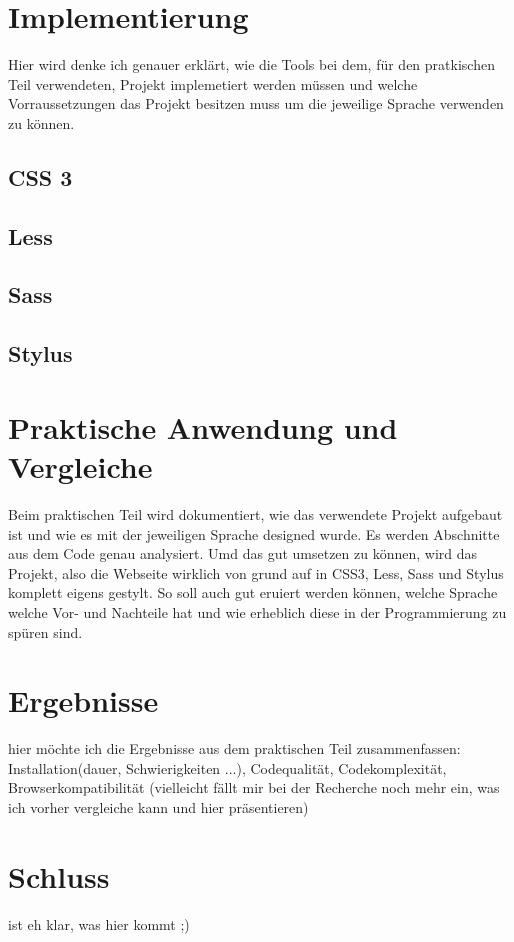 \section{Implementierung}
Hier wird denke ich genauer erklärt, wie die Tools bei dem, für den pratkischen Teil verwendeten, Projekt implemetiert werden müssen und welche  Vorraussetzungen das Projekt besitzen muss um die jeweilige Sprache verwenden zu können.

\subsection{CSS 3}

\subsection{Less}

\subsection{Sass}

\subsection{Stylus}


\section{Praktische Anwendung und Vergleiche}
Beim praktischen Teil wird dokumentiert, wie das verwendete Projekt aufgebaut ist und wie es mit der jeweiligen Sprache designed wurde. Es werden Abschnitte aus dem Code genau analysiert. Umd das gut umsetzen zu können, wird das Projekt, also die Webseite wirklich von grund auf in CSS3, Less, Sass und Stylus komplett eigens gestylt. So soll auch gut eruiert werden können, welche Sprache welche Vor- und Nachteile hat und wie erheblich diese in der Programmierung zu spüren sind. 

\section{Ergebnisse}
hier möchte ich die Ergebnisse aus dem praktischen Teil zusammenfassen: Installation(dauer, Schwierigkeiten ...), Codequalität, Codekomplexität, Browserkompatibilität (vielleicht fällt mir bei der Recherche noch mehr ein, was ich vorher vergleiche kann und hier präsentieren)

\section{Schluss}
ist eh klar, was hier kommt ;)




